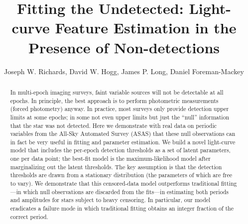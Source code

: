 \documentclass[12pt,preprint]{aastex}
\begin{document}

\title{Fitting the Undetected:  Light-curve Feature Estimation in the Presence of Non-detections}
\author{
Joseph W. Richards,
David W. Hogg,
James P. Long,
Daniel Foreman-Mackey
}
%


\begin{abstract}
In multi-epoch imaging surveys, faint variable sources will not be
detectable at all epochs.  In principle, the best approach is to
perform photometric measurements (forced photometry) anyway.
%
In practice, most surveys only provide detection upper limits at some
epochs; in some not even upper limits but just the ``null''
information that the star was not detected.
%
Here we demonstrate with real data on periodic variables from the
All-Sky Automated Survey (ASAS) that these null observations can
in fact be very useful in fitting and parameter estimation.
%
We build a novel light-curve model that includes the per-epoch
detection thresholds as a set of latent parameters, one per data
point; the best-fit model is the maximum-likelihood model after
marginalizing out the latent thresholds.
%
The key assumption is that the detection thresholds are drawn from a
stationary distribution (the parameters of which are free to vary).
%
We demonstrate that this censored-data model outperforms traditional
fitting---in which null observations are discarded from the
fits---in estimating both periods and amplitudes for stars subject to
heavy censoring.
%
In particular, our model eradicates a failure mode in which
traditional fitting obtains an integer fraction of the correct period.
\end{abstract}
\end{document}
